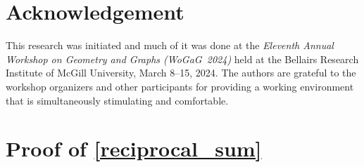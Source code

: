 \documentclass{patmorin}
\newcommand{\david}[1]{{\color{orange} David: #1}}
\begin{document}
\section*{Acknowledgement}

This research was initiated and much of it was done at the \emph{Eleventh Annual Workshop on Geometry and Graphs (WoGaG~2024)} held at the Bellairs Research Institute of McGill University, March 8--15, 2024. The authors are grateful to the workshop organizers and other participants for providing a working environment that is simultaneously stimulating and comfortable.





\appendix

\section{Proof of \cref{reciprocal_sum}}
\label{reciprocal_sum_section}


\reciprocalsum*
\end{document}
